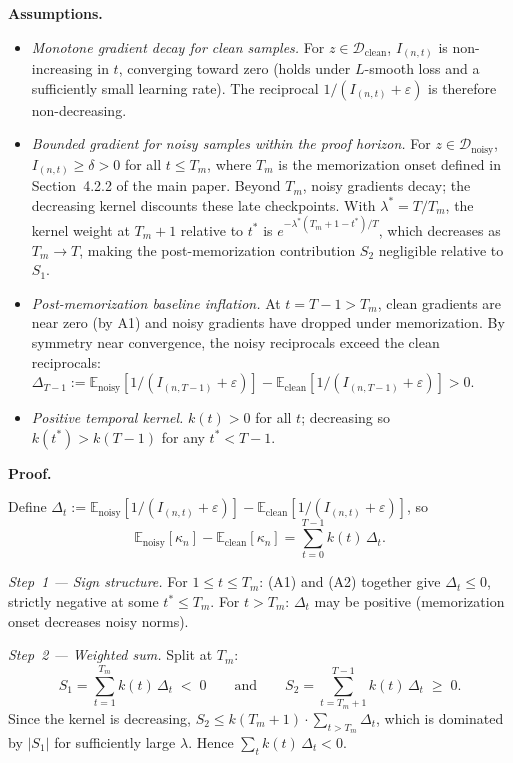 \documentclass[runningheads]{llncs}
\begin{document}
\textbf{Assumptions.}
\begin{itemize}
    \item[\textbf{(A1)}] \textit{Monotone gradient decay for clean samples.}
        For $z \in \mathcal{D}_\text{clean}$, $I_{(n,t)}$ is non-increasing in $t$, converging toward zero (holds under $L$-smooth loss and a sufficiently small learning rate). The reciprocal $1/(I_{(n,t)}+\varepsilon)$ is therefore non-decreasing.
    \item[\textbf{(A2)}] \textit{Bounded gradient for noisy samples within the proof horizon.}
        For $z \in \mathcal{D}_\text{noisy}$, $I_{(n,t)} \geq \delta > 0$ for all $t \leq T_m$, where $T_m$ is the memorization onset defined in Section~4.2.2 of the main paper.
        Beyond $T_m$, noisy gradients decay; the decreasing kernel discounts these late checkpoints.
        With $\lambda^* = T/T_m$, the kernel weight at $T_m+1$ relative to $t^*$ is $e^{-\lambda^*(T_m+1-t^*)/T}$, which decreases as $T_m \to T$, making the post-memorization contribution $S_2$ negligible relative to $S_1$.
    \item[\textbf{(A3)}] \textit{Post-memorization baseline inflation.}
        At $t = T-1 > T_m$, clean gradients are near zero (by A1) and noisy gradients have dropped under memorization.
        By symmetry near convergence, the noisy reciprocals exceed the clean reciprocals:
        $\Delta_{T-1} := \mathbb{E}_\text{noisy}[1/(I_{(n,T-1)}+\varepsilon)] - \mathbb{E}_\text{clean}[1/(I_{(n,T-1)}+\varepsilon)] > 0$.
    \item[\textbf{(A4)}] \textit{Positive temporal kernel.}
        $k(t) > 0$ for all $t$; decreasing so $k(t^*) > k(T-1)$ for any $t^* < T-1$.
\end{itemize}

\textbf{Proof.}

Define $\Delta_t := \mathbb{E}_\text{noisy}[1/(I_{(n,t)}+\varepsilon)] - \mathbb{E}_\text{clean}[1/(I_{(n,t)}+\varepsilon)]$, so
\begin{equation}
    \mathbb{E}_\text{noisy}[\kappa_n] - \mathbb{E}_\text{clean}[\kappa_n]
    = \sum_{t=0}^{T-1} k(t)\,\Delta_t.
\end{equation}

\textit{Step~1 --- Sign structure.}
For $1 \leq t \leq T_m$: (A1) and (A2) together give $\Delta_t \leq 0$, strictly negative at some $t^* \leq T_m$.
For $t > T_m$: $\Delta_t$ may be positive (memorization onset decreases noisy norms).

\textit{Step~2 --- Weighted sum.}
Split at $T_m$:
\begin{equation}
    S_1 = \sum_{t=1}^{T_m} k(t)\,\Delta_t \;<\; 0
    \qquad \text{and} \qquad
    S_2 = \sum_{t=T_m+1}^{T-1} k(t)\,\Delta_t \;\geq\; 0.
\end{equation}
Since the kernel is decreasing, $S_2 \leq k(T_m+1) \cdot \sum_{t > T_m} \Delta_t$, which is dominated by $|S_1|$ for sufficiently large $\lambda$.
Hence $\sum_t k(t)\,\Delta_t < 0$.
\end{document}
